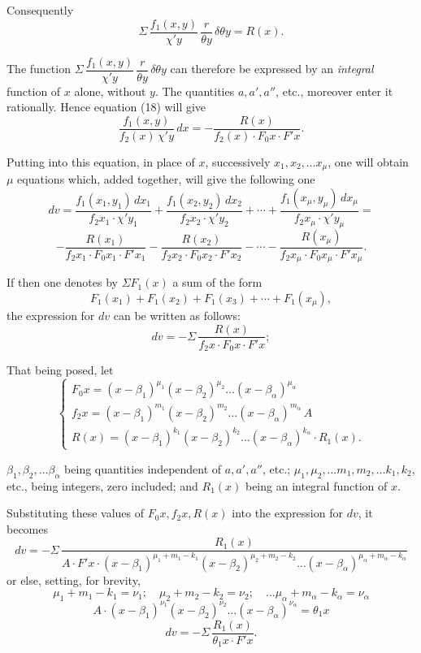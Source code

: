 \documentclass{article}
\begin{document}
Consequently
\[ \Sigma\,\frac{f_1(x, y)}{\chi' y}\,\frac{r}{\theta y}\,\delta\theta y = R(x). \tag{19} \]

The function $\Sigma\,\dfrac{f_1(x, y)}{\chi' y}\,\dfrac{r}{\theta y}\,\delta\theta y$ can therefore be expressed by an \emph{integral} function of $x$ alone, without $y$. The quantities $a, a', a''$, etc., moreover enter it rationally.
Hence equation (18) will give
\[ \frac{f_1(x, y)}{f_2(x)\,\chi' y}\,dx = -\frac{R(x)}{f_2(x) \cdot F_0 x \cdot F' x}. \tag{20} \]

Putting into this equation, in place of $x$, successively $x_1, x_2, \ldots x_\mu$, one will obtain $\mu$ equations which, added together, will give the following one
\[ dv = \frac{f_1(x_1, y_1)\,dx_1}{f_2 x_1 \cdot \chi' y_1} + \frac{f_1(x_2, y_2)\,dx_2}{f_2 x_2 \cdot \chi' y_2} + \cdots + \frac{f_1(x_\mu, y_\mu)\,dx_\mu}{f_2 x_\mu \cdot \chi' y_\mu} = \]
\[ -\frac{R(x_1)}{f_2 x_1 \cdot F_0 x_1 \cdot F' x_1} - \frac{R(x_2)}{f_2 x_2 \cdot F_0 x_2 \cdot F' x_2} - \cdots - \frac{R(x_\mu)}{f_2 x_\mu \cdot F_0 x_\mu \cdot F' x_\mu}. \tag{21} \]

If then one denotes by $\Sigma F_1(x)$ a sum of the form
\[ F_1(x_1) + F_1(x_2) + F_1(x_3) + \cdots + F_1(x_\mu), \]
the expression for $dv$ can be written as follows:
\[ dv = -\Sigma\,\frac{R(x)}{f_2 x \cdot F_0 x \cdot F' x}; \tag{22} \]

That being posed, let
\[ \begin{cases} F_0 x = (x-\beta_1)^{\mu_1}(x-\beta_2)^{\mu_2} \ldots (x-\beta_\alpha)^{\mu_\alpha} \\ f_2 x = (x-\beta_1)^{m_1}(x-\beta_2)^{m_2} \ldots (x-\beta_\alpha)^{m_\alpha}\,A \\ R(x) = (x-\beta_1)^{k_1}(x-\beta_2)^{k_2} \ldots (x-\beta_\alpha)^{k_\alpha} \cdot R_1(x). \end{cases} \tag{23} \]

$\beta_1, \beta_2, \ldots \beta_\alpha$ being quantities independent of $a, a', a''$, etc.; $\mu_1, \mu_2, \ldots m_1, m_2, \ldots k_1, k_2$, etc., being integers, zero included; and $R_1(x)$ being an integral function of $x$.

Substituting these values of $F_0 x, f_2 x, R(x)$ into the expression for $dv$, it becomes
\[ dv = -\Sigma\,\frac{R_1(x)}{A \cdot F' x \cdot (x-\beta_1)^{\mu_1+m_1-k_1}(x-\beta_2)^{\mu_2+m_2-k_2} \ldots (x-\beta_\alpha)^{\mu_\alpha+m_\alpha-k_\alpha}} \]
or else, setting, for brevity,
\[ \mu_1 + m_1 - k_1 = \nu_1; \quad \mu_2 + m_2 - k_2 = \nu_2; \quad \ldots \mu_\alpha + m_\alpha - k_\alpha = \nu_\alpha \tag{24} \]
\[ A \cdot (x-\beta_1)^{\nu_1}(x-\beta_2)^{\nu_2} \ldots (x-\beta_\alpha)^{\nu_\alpha} = \theta_1 x \tag{25} \]
\[ dv = -\Sigma\,\frac{R_1(x)}{\theta_1 x \cdot F' x}. \tag{26} \]
\end{document}

